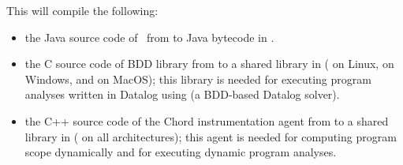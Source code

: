 \noindent This will compile the following:
\begin{itemize}
\item
the Java source code of \Chord\ from  to Java bytecode
in .
\item
the C source code of BDD library
 from
 to a shared library in 
( on Linux,  on Windows, and
 on MacOS); this library is needed for executing
program analyses written in Datalog using
 (a
BDD-based Datalog solver).
\item
the C++ source code of the Chord instrumentation agent from
 to a shared library in 
( on all architectures); this agent is
needed for computing program scope dynamically and for executing
dynamic program analyses.
\end{itemize}

